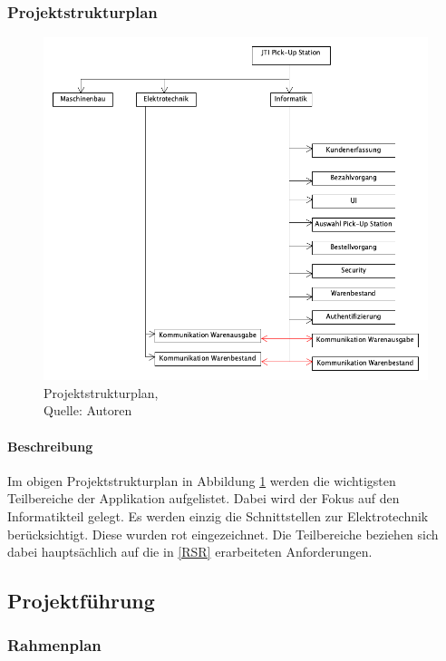 \subsubsection{Projektstrukturplan}

\begin{figure}[H]
    \centering
    \includegraphics[width=1\textwidth]{images/pmp.png}
    \caption[Projektstrukturplan]{Projektstrukturplan,\\ Quelle: Autoren}
    \label{img: Projektstrukturplan}
\end{figure}

\paragraph{Beschreibung}
Im obigen Projektstrukturplan in Abbildung \ref{img: Projektstrukturplan} werden die wichtigsten Teilbereiche der Applikation aufgelistet. Dabei wird der Fokus auf den Informatikteil gelegt. Es werden einzig die Schnittstellen zur Elektrotechnik berücksichtigt. Diese wurden rot eingezeichnet. Die Teilbereiche beziehen sich dabei hauptsächlich auf die in \ref{RSR} erarbeiteten Anforderungen. 
\newpage
\subsection{Projektführung}
\subsubsection{Rahmenplan}

